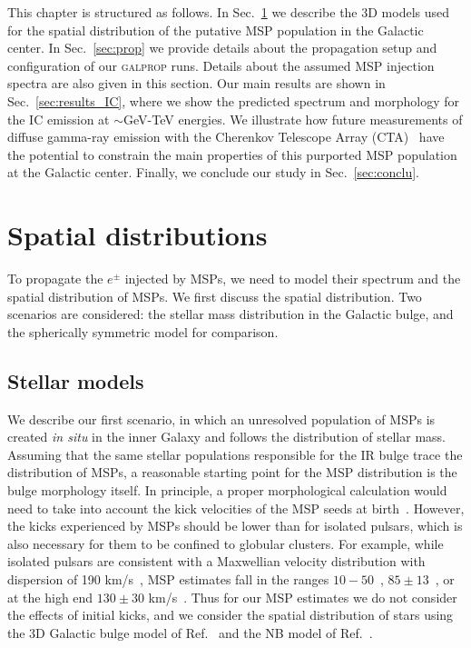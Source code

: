 \documentclass[doublespace,nopageskip]{VTthesis} %
\begin{document}
This chapter is structured as follows. In Sec.~\ref{sec:spatial} we describe the 3D models used for the spatial distribution of the putative MSP population in the Galactic center. In Sec.~\ref{sec:prop} we provide details about the propagation setup and configuration of our \textsc{galprop} runs. Details about the assumed MSP injection spectra are also given in this section. Our main results are shown in Sec.~\ref{sec:results_IC}, where we show the predicted spectrum and morphology for the IC emission at $\sim$GeV-TeV energies. We illustrate how future measurements of diffuse gamma-ray emission with the Cherenkov Telescope Array (CTA)~\cite{2009arXiv0912.3742W,2011ExA....32..193A} have the potential to constrain the main properties of this purported MSP population at the Galactic center. Finally, we conclude our study in Sec.~\ref{sec:conclu}.

\section{Spatial distributions}\label{sec:spatial}

To propagate the $e^\pm$ injected by MSPs, we need to model their spectrum and the spatial distribution of MSPs. We first discuss the spatial distribution. Two scenarios are considered: the stellar mass distribution in the Galactic bulge, and the spherically symmetric model for comparison.

\subsection{Stellar models}\label{sec:stellar}

We describe our first scenario, in which an unresolved population of MSPs is created \emph{in situ} in the inner Galaxy and follows the distribution of stellar mass. Assuming that the same stellar populations responsible for the IR bulge trace the distribution of MSPs, a reasonable starting point for the MSP distribution is the bulge morphology itself. In principle, a proper morphological calculation would need to take into account the kick velocities of the MSP seeds at birth~\cite{2018ApJ...862...79E}. However, the kicks experienced by MSPs should be lower than for isolated pulsars, which is also necessary for them to be confined to globular clusters. For example, while isolated pulsars are consistent with a Maxwellian velocity distribution with dispersion of 190 km/s~\cite{1997MNRAS.291..569H}, MSP estimates fall in the ranges $10-50$~\cite{2013PhRvD..88h3009H,1997ApJ...482..971C}, $85\pm13$~\cite{2004IAUS..218..139H}, or at the high end $130\pm30$ km/s~\cite{1998MNRAS.295..743L}. Thus for our MSP estimates we do not consider the effects of initial kicks, and we consider the spatial distribution of stars using the 3D Galactic bulge model of Ref.~\cite{1998ApJ...492..495F} and the NB model of Ref.~\cite{2002A&A...384..112L}.
\end{document}
